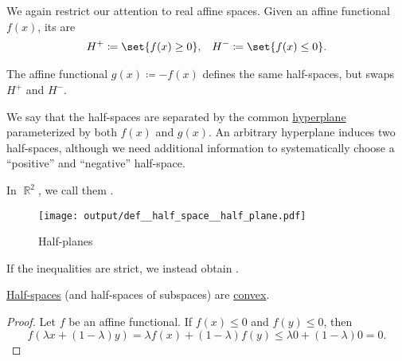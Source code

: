 \begin{definition}\label{def:half_space}
  We again restrict our attention to real affine spaces. Given an affine functional \( f(x) \), its  are
  \begin{align*}
    H^+ \coloneqq \set{ f(x) \geq 0 },
    &&
    H^- \coloneqq \set{ f(x) \leq 0 }.
  \end{align*}

  The affine functional \( g(x) \coloneqq -f(x) \) defines the same half-spaces, but swaps \( H^+ \) and \( H^- \).

  We say that the half-spaces are separated by the common \hyperref[def:affine_hyperplane]{hyperplane} parameterized by both \( f(x) \) and \( g(x) \). An arbitrary hyperplane induces two half-spaces, although we need additional information to systematically choose a \enquote{positive} and \enquote{negative} half-space.

  In \( \BbbR^2 \), we call them .

  \begin{figure}[!ht]
    \centering
    \texttt{[image: output/def\_\_half\_space\_\_half\_plane.pdf]}
    \caption{Half-planes}\label{fig:def:half_space/half_plane}
  \end{figure}

  If the inequalities are strict, we instead obtain .
\end{definition}

\begin{proposition}\label{thm:half_spaces_are_convex}
  \hyperref[def:half_space]{Half-spaces} (and half-spaces of subspaces) are \hyperref[def:convex_hull]{convex}.
\end{proposition}
\begin{proof}
  Let \( f \) be an affine functional. If \( f(x) \leq 0 \) and \( f(y) \leq 0 \), then
  \begin{equation*}
    f(\lambda x + (1 - \lambda) y)
    =
    \lambda f(x) + (1 - \lambda) f(y)
    \leq
    \lambda 0 + (1 - \lambda) 0
    =
    0.
  \end{equation*}
\end{proof}

